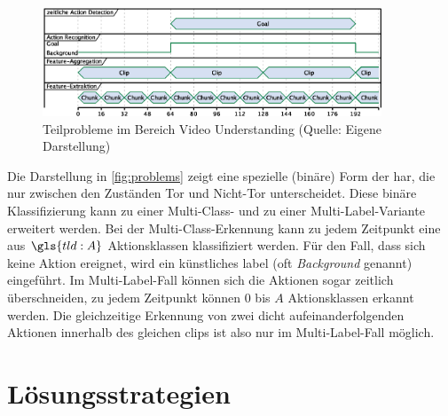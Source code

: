 \begin{figure}[htbp]
    \centering
    \includegraphics[width=0.9\textwidth, height=0.9\textwidth, keepaspectratio, interpolate]{fig/problems.eps}
    \caption[Teilprobleme im Bereich Video Understanding]{Teilprobleme im Bereich Video Understanding (Quelle: Eigene Darstellung)}
    \label{fig:problems}
\end{figure}

Die Darstellung in \autoref{fig:problems} zeigt eine spezielle (binäre) Form der \gls{har}, die nur zwischen den Zuständen Tor und Nicht-Tor unterscheidet.
Diese binäre Klassifizierung kann zu einer Multi-Class- und zu einer Multi-Label-Variante erweitert werden.
Bei der Multi-Class-Erkennung kann zu jedem Zeitpunkt eine aus $\gls{tld:A}$ Aktionsklassen klassifiziert werden.
Für den Fall, dass sich keine Aktion ereignet, wird ein künstliches \gls{label} (oft \emph{Background} genannt) eingeführt.
Im Multi-Label-Fall können sich die Aktionen sogar zeitlich überschneiden, \dh zu jedem Zeitpunkt können $0$ bis $A$ Aktionsklassen erkannt werden.
Die gleichzeitige Erkennung von zwei dicht aufeinanderfolgenden Aktionen innerhalb des gleichen \glspl{clip} ist also nur im Multi-Label-Fall möglich.


\section{Lösungsstrategien}
\label{sec:loesungsstrategien}

